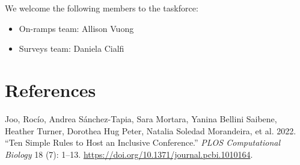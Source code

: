 We welcome the following members to the taskforce:

\begin{itemize}
\tightlist
\item
  On-ramps team: Allison Vuong
\item
  Surveys team: Daniela Cialfi
\end{itemize}

\hypertarget{references}{%
\section*{References}\label{references}}

\hypertarget{refs}{}
\begin{CSLReferences}{1}{0}
\leavevmode{}%
Joo, Rocío, Andrea Sánchez-Tapia, Sara Mortara, Yanina Bellini Saibene, Heather Turner, Dorothea Hug Peter, Natalia Soledad Morandeira, et al. 2022. {``Ten Simple Rules to Host an Inclusive Conference.''} \emph{PLOS Computational Biology} 18 (7): 1--13. \url{https://doi.org/10.1371/journal.pcbi.1010164}.

\end{CSLReferences}



\address{%
Heather Turner\\
University of Warwick\\%
UK\\
%
%
%
\href{mailto:Heather.Turner@R-Project.org}{\nolinkurl{Heather.Turner@R-Project.org}}%
}
